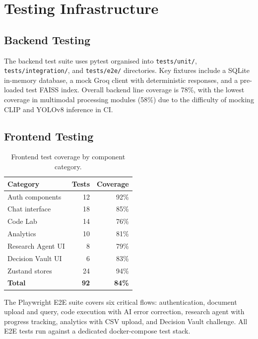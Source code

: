 \section{Testing Infrastructure}
\label{sec:testing-impl}

\subsection{Backend Testing}
\label{subsec:backend-tests}

The backend test suite uses pytest organised into \texttt{tests/unit/}, \texttt{tests/integration/}, and \texttt{tests/e2e/} directories. Key fixtures include a SQLite in-memory database, a mock Groq client with deterministic responses, and a pre-loaded test FAISS index. Overall backend line coverage is 78\%, with the lowest coverage in multimodal processing modules (58\%) due to the difficulty of mocking CLIP and YOLOv8 inference in CI.

\subsection{Frontend Testing}
\label{subsec:frontend-tests}

\begin{table}[ht]
    \centering
    \caption{Frontend test coverage by component category.}
    \label{tab:frontend-coverage}
    \renewcommand{\arraystretch}{1.3}
    \begin{tabular}{lrr}
        \toprule
        \textbf{Category} & \textbf{Tests} & \textbf{Coverage} \\
        \midrule
        Auth components     & 12 & 92\% \\
        Chat interface      & 18 & 85\% \\
        Code Lab            & 14 & 76\% \\
        Analytics           & 10 & 81\% \\
        Research Agent UI   & 8  & 79\% \\
        Decision Vault UI   & 6  & 83\% \\
        Zustand stores      & 24 & 94\% \\
        \midrule
        \textbf{Total}      & \textbf{92} & \textbf{84\%} \\
        \bottomrule
    \end{tabular}
\end{table}

The Playwright E2E suite covers six critical flows: authentication, document upload and query, code execution with AI error correction, research agent with progress tracking, analytics with CSV upload, and Decision Vault challenge. All E2E tests run against a dedicated docker-compose test stack.

